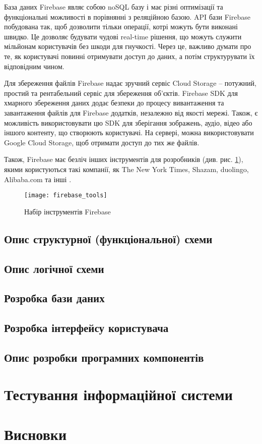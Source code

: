 \documentclass[../main.tex]{subfiles}
\begin{document}
База даних Firebase являє собою noSQL базу і має різні оптимізації та функціональні можливості в порівнянні з реляційною базою. API бази Firebase побудована так, щоб дозволити тільки операції, котрі можуть бути виконані швидко. Це дозволяє будувати чудові real-time рішення, що можуть служити мільйонам користувачів без шкоди для гнучкості. Через це, важливо думати про те, як користувачі повинні отримувати доступ до даних, а потім структурувати їх відповідним чином.

Для збереження файлів Firebase надає зручний сервіс Cloud Storage -- потужний, простий та рентабельний сервіс для збереження об'єктів. Firebase SDK для хмарного збереження даних додає безпеки до процесу вивантаження та завантаження файлів для Firebase додатків, незалежно від якості мережі. Також, є можливість використовувати цю SDK для зберігання зображень, аудіо, відео або іншого контенту, що створюють користувачі. На сервері, можна використовувати Google Cloud Storage, щоб отримати доступ до тих же файлів.


Також, Firebase має безліч інших інструментів для розробників (див. рис. \ref{figure:firebase_tools}), якими користуються такі компанії, як The New York Times, Shazam, duolingo, Alibaba.com та інші \cite{firebase}.

\begin{figure}[H]
	\centering
	\texttt{[image: firebase\_tools]}
	\caption{Набір інструментів Firebase}
	\label{figure:firebase_tools}
\end{figure}

\subsection{Опис структурної (функціональної) схеми}

\subsection{Опис логічної схеми}

\subsection{Розробка бази даних}

\subsection{Розробка інтерфейсу користувача}

\subsection{Опис розробки програмних компонентів}

\section{Тестування інформаційної системи}

\section{Висновки}

	
\end{document}
